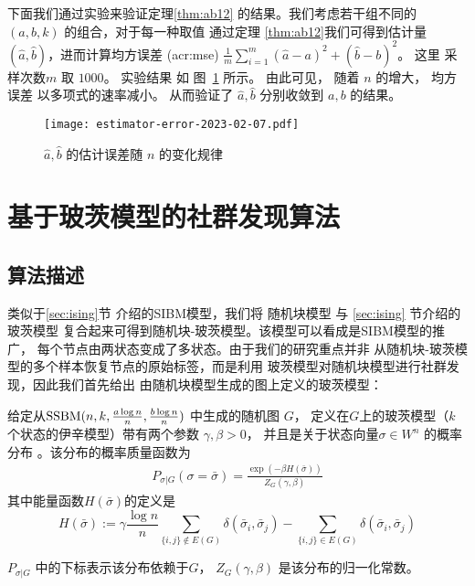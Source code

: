 下面我们通过实验来验证定理\ref{thm:ab12}
的结果。我们考虑若干组不同的
$(a,b,k)$ 的组合，对于每一种取值
通过定理 \ref{thm:ab12}我们可得到估计量
$(\hat{a}, \hat{b})$，进而计算均方误差
 (\gls{acr:mse}) $\frac{1}{m} \sum_{i=1}^m (\hat{a}-a)^2 + (\hat{b}-b)^2$。
 这里  采样次数$m$ 取 $1000$。
 实验结果 如
 图~\ref{fig:estimator} 所示。
 由此可见， 随着 $n$ 的增大，
 均方误差 以多项式的速率减小。
 从而验证了 $\hat{a}, \hat{b}$ 分别收敛到 $a,b$ 
的结果。

\begin{figure}[ht!]
	\centering
		\texttt{[image: estimator-error-2023-02-07.pdf]}
		\caption{ $\hat{a}, \hat{b}$ 的估计误差随
		$n$ 的变化规律 }\label{fig:estimator}
\end{figure}

\section{基于玻茨模型的社群发现算法}\label{sec:potts}
\subsection{算法描述}
类似于\ref{sec:ising}节
介绍的SIBM模型，我们将
随机块模型
与 \ref{sec:ising} 节介绍的 玻茨模型
复合起来可得到随机块-玻茨模型。该模型可以看成是SIBM模型的推广，
每个节点由两状态变成了多状态。由于我们的研究重点并非
从随机块-玻茨模型的多个样本恢复节点的原始标签，而是利用
玻茨模型对随机块模型进行社群发现，因此我们首先给出
由随机块模型生成的图上定义的玻茨模型：
\begin{definition}\label{def:ising}
	给定从$\operatorname{SSBM}(n,k,\frac{a \log n}{n},\frac{b \log n}{n})$ 中生成的随机图 $G$，
    定义在$G$上的玻茨模型（$k$个状态的伊辛模型）带有两个参数 $\gamma,\beta>0$，
	并且是关于状态向量$\sigma\in W^n$ 的概率分布
。该分布的概率质量函数为
\begin{align} \label{eq:isingma}
	P_{\sigma|G}(\sigma=\bar{\sigma})=\frac{\exp(-\beta H(\bar{\sigma}))}{Z_G(\gamma,\beta)}
	\end{align}
其中能量函数$H(\bar{\sigma})$的定义是
\begin{equation}\label{eq:energy}
	H(\bar{\sigma}) := \gamma \frac{\log n}{n} \sum_{\{i,j\}\not\in E(G)} \delta(\bar{\sigma}_i, \bar{\sigma}_j)
	- \sum_{\{i,j\}\in E(G)} \delta(\bar{\sigma}_i, \bar{\sigma}_j)
	\end{equation}
	
	$P_{\sigma|G}$ 中的下标表示该分布依赖于$G$，
    $Z_G(\gamma,\beta)$ 是该分布的归一化常数。
\end{definition}

